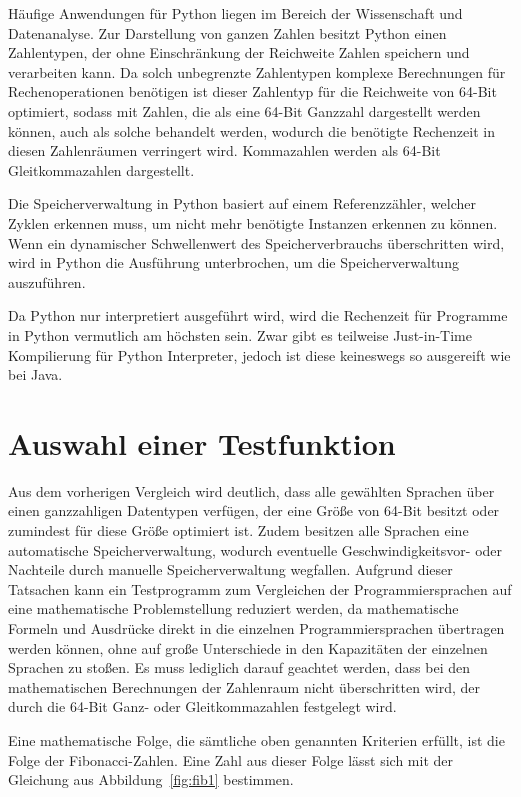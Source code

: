 \documentclass[11pt, parskip=half]{scrartcl}       %
\begin{document}
Häufige Anwendungen für Python liegen im Bereich der Wissenschaft und Datenanalyse.
Zur Darstellung von ganzen Zahlen besitzt Python einen Zahlentypen, der ohne Einschränkung der Reichweite Zahlen speichern und verarbeiten kann.
Da solch unbegrenzte Zahlentypen komplexe Berechnungen für Rechenoperationen benötigen ist dieser Zahlentyp für die Reichweite von 64-Bit optimiert, sodass mit Zahlen, die als eine 64-Bit Ganzzahl dargestellt werden können, auch als solche behandelt werden, wodurch die benötigte Rechenzeit in diesen Zahlenräumen verringert wird.\cite{github_python_long}
Kommazahlen werden als 64-Bit Gleitkommazahlen dargestellt.

Die Speicherverwaltung in Python basiert auf einem Referenzzähler, welcher Zyklen erkennen muss, um nicht mehr benötigte Instanzen erkennen zu können.
Wenn ein dynamischer Schwellenwert des Speicherverbrauchs überschritten wird, wird in Python die Ausführung unterbrochen, um die Speicherverwaltung auszuführen.

Da Python nur interpretiert ausgeführt wird, wird die Rechenzeit für Programme in Python vermutlich am höchsten sein.
Zwar gibt es teilweise Just-in-Time Kompilierung für Python Interpreter, jedoch ist diese keineswegs so ausgereift wie bei Java.


\section{Auswahl einer Testfunktion}

Aus dem vorherigen Vergleich wird deutlich, dass alle gewählten Sprachen über einen ganzzahligen Datentypen verfügen, der eine Größe von 64-Bit besitzt oder zumindest für diese Größe optimiert ist.
Zudem besitzen alle Sprachen eine automatische Speicherverwaltung, wodurch eventuelle Geschwindigkeitsvor- oder Nachteile durch manuelle Speicherverwaltung wegfallen.
Aufgrund dieser Tatsachen kann ein Testprogramm zum Vergleichen der Programmiersprachen auf eine mathematische Problemstellung reduziert werden, da mathematische Formeln und Ausdrücke direkt in die einzelnen Programmiersprachen übertragen werden können, ohne auf große Unterschiede in den Kapazitäten der einzelnen Sprachen zu stoßen.
Es muss lediglich darauf geachtet werden, dass bei den mathematischen Berechnungen der Zahlenraum nicht überschritten wird, der durch die 64-Bit Ganz- oder Gleitkommazahlen festgelegt wird.


Eine mathematische Folge, die sämtliche oben genannten Kriterien erfüllt, ist die Folge der Fibonacci-Zahlen.
Eine Zahl aus dieser Folge lässt sich mit der Gleichung aus Abbildung~\ref{fig:fib1} bestimmen.
\end{document}
